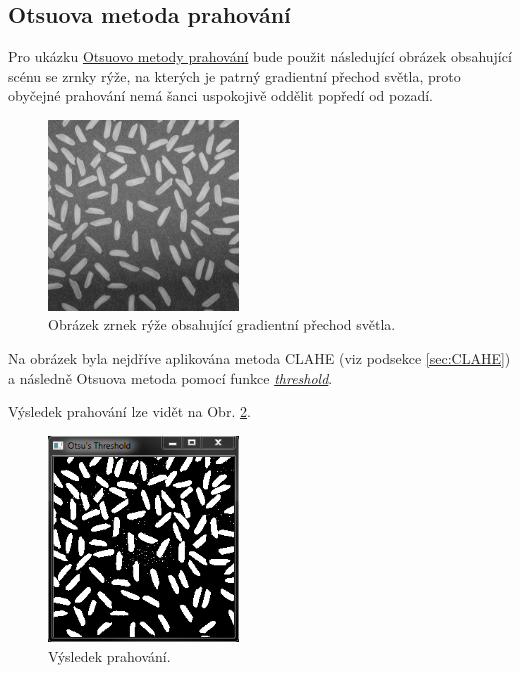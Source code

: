 \documentclass[12pt, a4paper]{article}
\begin{document}
\newpage











\subsection{Otsuova metoda prahování}
\label{sec:Otsu}
\par{Pro ukázku \href{http://en.wikipedia.org/wiki/Otsu's_method}{Otsuovo metody prahování} bude použit následující obrázek obsahující scénu se zrnky rýže, na kterých je patrný gradientní přechod světla, proto obyčejné prahování nemá šanci uspokojivě oddělit popředí od pozadí.
\begin{figure}[!ht]
	\centering
	\includegraphics[width=0.45\textwidth]{rice.jpg}
	\caption{Obrázek zrnek rýže obsahující gradientní přechod světla.} 	
	\label{fig:rice}
\end{figure}
Na obrázek byla nejdříve aplikována metoda CLAHE (viz podsekce \ref{sec:CLAHE}) a následně Otsuova metoda pomocí funkce \href{http://docs.opencv.org/modules/imgproc/doc/miscellaneous_transformations.html?highlight=threshold#cv2.threshold}{\textit{threshold}}.

Výsledek prahování lze vidět na Obr. \ref{fig:threshold_rice}.
\begin{figure}[!ht]
	\centering
	\includegraphics[width=0.45\textwidth]{threshold_rice.png}
	\caption{Výsledek prahování.}
	\label{fig:threshold_rice}
\end{figure}
}
\end{document}
